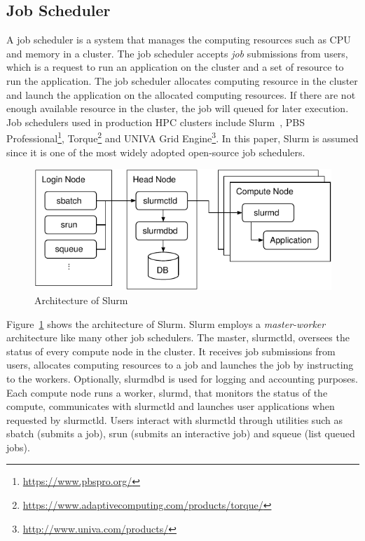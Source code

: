 \documentclass[graybox]{svmult}
\begin{document}
\subsection{Job Scheduler}\label{kt:sec:ii-jms}

A job scheduler is a system that manages the computing resources such as CPU
and memory in a cluster. The job scheduler accepts \textit{job} submissions
from users, which is a request to run an application on the cluster and a set
of resource to run the application. The job scheduler allocates computing
resource in the cluster and launch the application on the allocated computing
resources. If there are not enough available resource in the cluster, the job
will queued for later execution. Job schedulers used in production HPC
clusters include Slurm~\cite{Yoo2003}, PBS
Professional\footnote{\url{https://www.pbspro.org/}},
Torque\footnote{\url{https://www.adaptivecomputing.com/products/torque/}} and
UNIVA Grid Engine\footnote{\url{http://www.univa.com/products/}}. In this
paper, Slurm is assumed since it is one of the most widely adopted open-source
job schedulers.

\begin{figure}
    \centering
    \includegraphics{slurm}
    \caption{Architecture of Slurm}%
    \label{kt:fig:slurm}
\end{figure}

Figure~\ref{kt:fig:slurm} shows the architecture of Slurm. Slurm employs a
\textit{master-worker} architecture like many other job schedulers. The
master, slurmctld, oversees the status of every compute node in the cluster.
It receives job submissions from users, allocates computing resources to a job
and launches the job by instructing to the workers. Optionally, slurmdbd is
used for logging and accounting purposes. Each compute node runs a worker,
slurmd, that monitors the status of the compute, communicates with slurmctld
and launches user applications when requested by slurmctld. Users interact
with slurmctld through utilities such as sbatch (submits a job), srun (submits
an interactive job) and squeue (list queued jobs).
\end{document}
